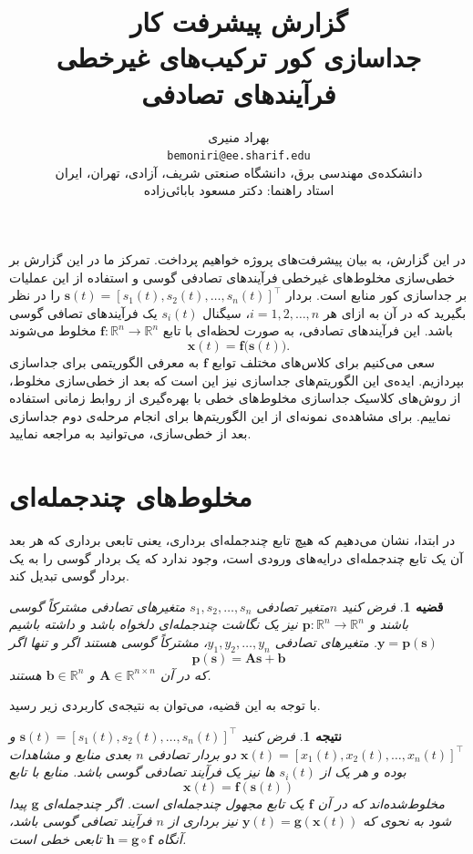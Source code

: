 \documentclass{article}
\title{{\large
گزارش پیشرفت کار}\\
جداسازی کور ترکیب‌های غیرخطی فرآیند‌های تصادفی
}
\author{
	بهراد منیری\\
	\texttt{bemoniri@ee.sharif.edu}\\
	\normalsize{دانشکده‌ی مهندسی برق، دانشگاه صنعتی شریف، آزادی، تهران، ایران}
	\vspace{0.5cm}\\
	استاد راهنما:
	دکتر مسعود بابائی‌زاده
}
\date{}
\newtheorem{cor}{{\large\bf نتیجه}}[section]
\newtheorem{thm}{{\large\bf قضیه}}[section]
\begin{document}
		\twocolumn
	\maketitle

در این گزارش، به بیان پیشرفت‌های پروژه خواهیم پر‌داخت. تمرکز ما در این گزارش بر خطی‌سازی مخلوط‌های غیرخطی فرآیند‌های تصادفی گوسی و استفاده از این عملیات بر جداسازی کور منابع است. بردار 
$\mathbf{s}(t) = [s_1(t), s_2(t), \dots, s_n(t)]^\top$
را در نظر بگیرید که در آن به ازای هر 
$i = 1,2, \dots, n$،
سیگنال
$s_i(t)$
یک  فرآیند‌های تصافی گوسی باشد. این فرآیند‌های تصادفی، به صورت لحظه‌ای با تابع 
$\mathbf{f}: \mathbb{R}^n \to \mathbb{R}^n$
مخلوط می‌شوند
$$\mathbf{x}(t) = \mathbf{f}\big(\mathbf{s}(t)\big).$$
سعی می‌کنیم برای کلاس‌های مختلف توابع 
$\mathbf{f}$
به معرفی الگوریتمی برای جداسازی بپردازیم. ایده‌ی این الگوریتم‌های جداسازی نیز این است که بعد از خطی‌سازی مخلوط، از روش‌های کلاسیک جداسازی مخلوط‌های خطی با بهره‌گیری از روابط زمانی استفاده نماییم. برای مشاهده‌ی نمونه‌ای از این الگوریتم‌ها برای انجام مرحله‌ی دوم جداسازی بعد از خطی‌سازی، می‌توانید به 
\cite{newHyva, TCL, PCL,ICAbook,comon2010handbook,shahram,harmeling2003kernel}
مراجعه نمایید.
\section{مخلوط‌های چندجمله‌ای}

در ابتدا، نشان می‌دهیم که هیچ تابع چند‌جمله‌ای برداری، یعنی تابعی برداری که هر بعد آن یک تابع چند‌جمله‌ای درایه‌های ورودی است، وجود ندارد که یک بردار گوسی را به یک بردار گوسی تبدیل کند.
\begin{thm}
فرض کنید $n$متغیر تصادفی 
$s_1, s_2, \dots, s_n$
متغیرهای تصادفی مشترکاً گوسی باشند و 
$\mathbf{p}: \mathbb{R}^n\to\mathbb{R}^n$
نیز یک نگاشت چند‌جمله‌ای دلخواه باشد و داشته باشیم
$\mathbf{y} = \mathbf{p}(\mathbf{s}) $.
متغیرهای تصادفی 
$y_1, y_2, \dots, y_n$،
مشترکاً گوسی هستند اگر و تنها اگر
$$\mathbf{p}(\mathbf{s}) = \mathbf{A}\mathbf{s} + \mathbf{b}$$
که در آن 
$\mathbf{A} \in \mathbb{R}^{n\times n}$
و 
$\mathbf{b} \in \mathbb{R}^n$
هستند.
\end{thm}

با توجه به این قضیه‌، می‌توان به  نتیجه‌ی کاربردی زیر رسید.

\begin{cor}
فرض کنید 
$\mathbf{s}(t) = [s_1(t), s_2(t), \dots, s_n(t)]^\top$
و
$\mathbf{x}(t)= [x_1(t), x_2(t), \dots, x_n(t)]^\top$
دو بردار تصادفی $n$ بعدی منابع و مشاهدات بوده و هر یک از
$s_i(t)$
ها نیز یک فرآیند تصادفی گوسی باشد. منابع با تابع
$$\mathbf{x}(t) = \mathbf{f}(\mathbf{s}(t))$$
مخلوط‌شده‌اند که در آن
$\mathbf{f}$
یک تابع مجهول چندجمله‌ای است. اگر چندجمله‌ای 
$\mathbf{g}$
پیدا شود به نحوی که 
$\mathbf{y}(t) = \mathbf{g}(\mathbf{x}(t))$
نیز برداری از $n$ فرآیند تصافی گوسی باشد، آنگاه 
$\mathbf{h} = \mathbf{g}\circ \mathbf{f} $
تابعی خطی است.
\end{cor}
\end{document}
